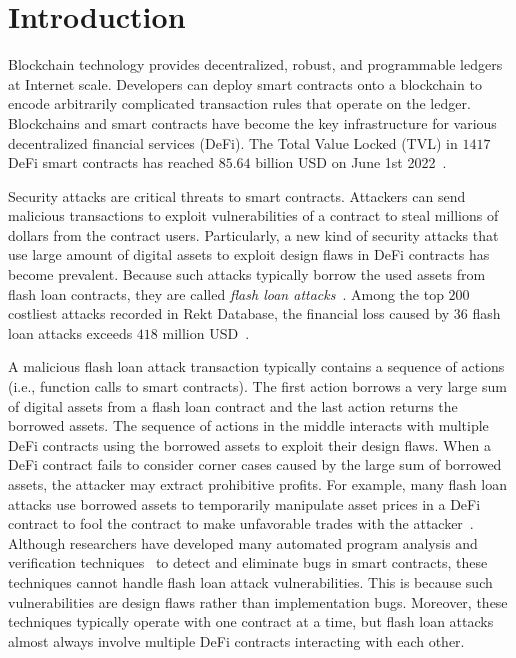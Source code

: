 \chapter{Introduction}
\label{sec:intro}

Blockchain technology provides decentralized, robust, and programmable ledgers
at Internet scale. Developers can deploy smart contracts onto a blockchain
to encode arbitrarily complicated transaction rules that operate on the ledger. 
Blockchains and smart contracts have become the key infrastructure for various
decentralized financial services (DeFi). The Total Value Locked (TVL) in $1417$
DeFi smart contracts has reached $85.64$ billion USD on June 1st
2022~\cite{DeFillama}.


Security attacks are critical threats to smart contracts. Attackers can send
malicious transactions to exploit vulnerabilities of a contract to steal
millions of dollars from the contract users. Particularly, a new kind of
security attacks that use large amount of digital assets to exploit design
flaws in DeFi contracts has become prevalent. Because such attacks typically
borrow the used assets from flash loan contracts, they are called \emph{flash
loan attacks}~\cite{SlowMistStats, mckay2022defi}. Among the top $200$ costliest
attacks recorded in Rekt Database,  the financial loss caused by $36$
flash loan attacks exceeds $418$ million USD~\cite{mckay2022defi}.

A malicious flash loan attack transaction typically contains a sequence of
actions (i.e., function calls to smart contracts). The first action borrows a
very large sum of digital assets from a flash loan contract and the last action
returns the borrowed assets. The sequence of actions in the middle interacts
with multiple DeFi contracts using the borrowed assets to exploit their design
flaws. When a DeFi contract fails to consider corner cases caused by the large
sum of borrowed assets, the attacker may extract prohibitive profits. For
example, many flash loan attacks use borrowed assets to temporarily manipulate
asset prices in a DeFi contract to fool the contract to make unfavorable trades
with the attacker~\cite{qin2021attacking,cao2021flashot}. Although researchers
have developed many automated program analysis and verification
techniques~\cite{mossberg2019manticore,feng2019precise, grieco2020echidna,
brent2020ethainter} to detect and eliminate bugs in smart
contracts, these techniques cannot handle flash loan attack vulnerabilities.
This is because such vulnerabilities are design flaws rather than
implementation bugs. Moreover, these techniques typically operate with one
contract at a time, but flash loan attacks almost always involve multiple DeFi
contracts interacting with each other.


